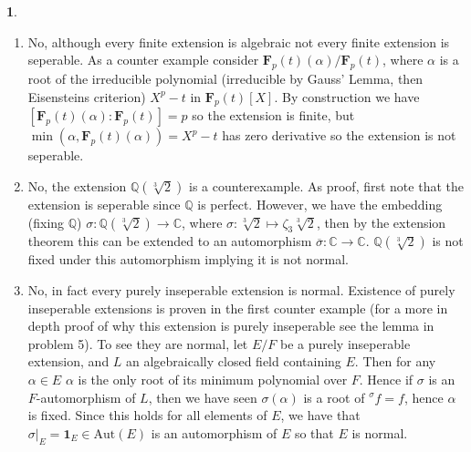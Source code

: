 \documentclass[11pt]{article}
\theoremstyle{definition}
\newtheorem{pb}{}
\begin{document}
    \begin{pb}
        \begin{enumerate}
            \item No, although every finite extension is algebraic not every finite extension is seperable. As a counter example consider
            \(\mathbf{F}_p(t)(\alpha)/\mathbf{F}_p(t)\), where \(\alpha\) is a root of the irreducible polynomial (irreducible by Gauss' Lemma, then Eisensteins criterion)
            \(X^p - t\) in \(\mathbf{F}_p(t)[X]\). By construction we have \([\mathbf{F}_p(t)(\alpha):\mathbf{F}_p(t)] = p\) so the extension is finite,
            but \(\min(\alpha,\mathbf{F}_p(t)(\alpha)) =  X^p - t\) has zero derivative so the extension is not seperable.

            \item No, the extension \(\mathbb{Q}(\sqrt[3]{2})\) is a counterexample. As proof, first note that the extension is seperable since \(\mathbb{Q}\) is perfect.
            However, we have the embedding (fixing \(\mathbb{Q}\)) \(\sigma: \mathbb{Q}(\sqrt[3]{2}) \to \mathbb{C}\), where \(\sigma: \sqrt[3]{2} \mapsto \zeta_3\sqrt[3]{2}\), then by the extension theorem this can be
            extended to an automorphism \(\overline{\sigma}:\mathbb{C} \to \mathbb{C}\). \(\mathbb{Q}(\sqrt[3]{2})\) is not fixed under this automorphism implying it is not normal.

            \item No, in fact every purely inseperable extension is normal. Existence of purely inseperable extensions is proven in the first counter example 
            (for a more in depth proof of why this extension is purely inseperable see the lemma in problem 5). To see they are normal, let
            \(E/F\) be a purely inseperable extension, and \(L\) an algebraically closed field containing \(E\). Then for any \(\alpha \in E\)
            \(\alpha\) is the only root of its minimum polynomial over \(F\). Hence if \(\sigma\) is an \(F\)-automorphism of \(L\), then
            we have seen \(\sigma(\alpha)\) is a root of \({}^\sigma f = f\), hence \(\alpha\) is fixed. Since this holds for all elements of \(E\), we have that
            \(\sigma\vert_E = \mathbf{1}_E \in \text{Aut}(E)\) is an automorphism of \(E\) so that \(E\) is normal.
        \end{enumerate}
    \end{pb}
\end{document}
